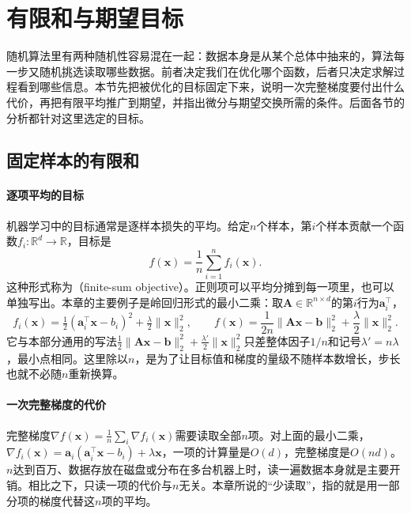 \section{有限和与期望目标}
\label{sec:opt-sto-objectives}

随机算法里有两种随机性容易混在一起：数据本身是从某个总体中抽来的，算法每一步又随机挑选读取哪些数据。前者决定我们在优化哪个函数，后者只决定求解过程看到哪些信息。本节先把被优化的目标固定下来，说明一次完整梯度要付出什么代价，再把有限平均推广到期望，并指出微分与期望交换所需的条件。后面各节的分析都针对这里选定的目标。

\subsection{固定样本的有限和}
\label{sec:opt-sto-finite-sum}

\paragraph{逐项平均的目标}
机器学习中的目标通常是逐样本损失的平均。给定$n$个样本，第$i$个样本贡献一个函数$f_i:\mathbb R^d\to\mathbb R$，目标是
\begin{equation}
\label{eq:opt-sto-finite-sum}
  f(\bm x)=\frac1n\sum_{i=1}^n f_i(\bm x).
\end{equation}
这种形式称为（finite-sum objective）。正则项可以平均分摊到每一项里，也可以单独写出。本章的主要例子是岭回归形式的最小二乘：取$\bm A\in\mathbb R^{n\times d}$的第$i$行为$\bm a_i^\top$，
\[
  f_i(\bm x)=\tfrac12(\bm a_i^\top\bm x-b_i)^2+\tfrac{\lambda}{2}\lVert\bm x\rVert_2^2,\qquad
  f(\bm x)=\frac1{2n}\lVert\bm A\bm x-\bm b\rVert_2^2+\frac{\lambda}{2}\lVert\bm x\rVert_2^2 .
\]
它与本部分通用的写法$\tfrac12\lVert\bm A\bm x-\bm b\rVert_2^2+\tfrac{\lambda'}{2}\lVert\bm x\rVert_2^2$只差整体因子$1/n$和记号$\lambda'=n\lambda$，最小点相同。这里除以$n$，是为了让目标值和梯度的量级不随样本数增长，步长也就不必随$n$重新换算。

\paragraph{一次完整梯度的代价}
完整梯度$\nabla f(\bm x)=\frac1n\sum_i\nabla f_i(\bm x)$需要读取全部$n$项。对上面的最小二乘，$\nabla f_i(\bm x)=\bm a_i(\bm a_i^\top\bm x-b_i)+\lambda\bm x$，一项的计算量是$O(d)$，完整梯度是$O(nd)$。$n$达到百万、数据存放在磁盘或分布在多台机器上时，读一遍数据本身就是主要开销。相比之下，只读一项的代价与$n$无关。本章所说的“少读取”，指的就是用一部分项的梯度代替这$n$项的平均。

